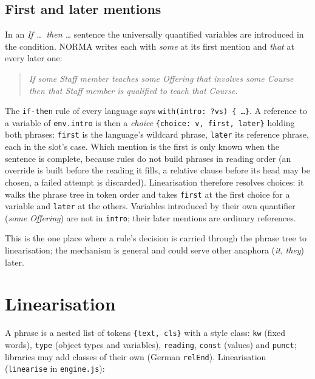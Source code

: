 \documentclass[11pt, a4paper]{article}
\newcommand{\code}[1]{\texttt{\color{codefg}#1}}
\begin{document}
\subsection{First and later mentions}
\label{sec:choices}

In an \textit{If \ldots\ then \ldots} sentence the universally quantified
variables are introduced in the condition. NORMA writes each with
\textit{some} at its first mention and \textit{that} at every later one:

\begin{quote}
\textit{If some Staff member teaches some Offering that involves some Course
then that Staff member is qualified to teach that Course.}
\end{quote}

The \code{if-then} rule of every language says
\code{with(intro: ?vs) \{ \ldots \}}. A reference to a variable of
\code{env.intro} is then a \emph{choice}
\code{\{choice: v, first, later\}} holding both phrases: \code{first} is the
language's wildcard phrase, \code{later} its reference phrase, each in the
slot's case. Which mention is the first is only known when the sentence is
complete, because rules do not build phrases in reading order (an override
is built before the reading it fills, a relative clause before its head may
be chosen, a failed attempt is discarded). Linearisation therefore resolves
choices: it walks the phrase tree in token order and takes \code{first} at
the first choice for a variable and \code{later} at the others. Variables
introduced by their own quantifier (\textit{some Offering}) are not in
\code{intro}; their later mentions are ordinary references.

This is the one place where a rule's decision is carried through the phrase
tree to linearisation; the mechanism is general and could serve other
anaphora (\textit{it}, \textit{they}) later.

\section{Linearisation}
\label{sec:linearise}

A phrase is a nested list of tokens \code{\{text, cls\}} with a style class:
\code{kw} (fixed words), \code{type} (object types and variables),
\code{reading}, \code{const} (values) and \code{punct}; libraries may add
classes of their own (German \code{relEnd}). Linearisation (\code{linearise}
in \code{engine.js}):
\end{document}
